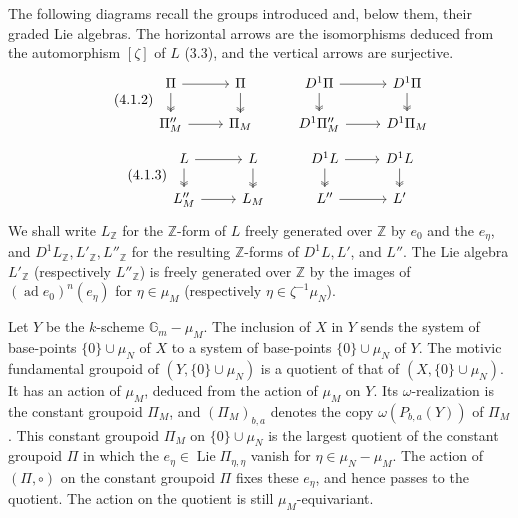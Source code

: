 \documentclass[10pt,a4paper]{article}
\newcommand{\Gm}{\mathbb G_m}
\newcommand{\Z}{\mathbb Z}
\newcommand{\Lie}{\operatorname{Lie}}
\newcommand{\ad}{\operatorname{ad}}
\theoremstyle{deligne}
\newcommand{\heading}[1]{\vspace{0.65em}\noindent{\bfseries #1}\quad}
\begin{document}
The following diagrams recall the groups introduced and, below them, their graded Lie algebras. The horizontal arrows are the isomorphisms deduced from the automorphism \([\zeta]\) of \(L\) (3.3), and the vertical arrows are surjective.
\[
\tag{4.1.2}
\begin{tikzcd}[column sep=2.5em,row sep=1.35em]
\Pi \arrow[r] \arrow[d,two heads] & \Pi \arrow[d,two heads]
& D^1\Pi \arrow[r] \arrow[d,two heads] & D^1\Pi \arrow[d,two heads]\\
\Pi_M^{\prime\prime} \arrow[r] & \Pi_M
& D^1\Pi_M^{\prime\prime} \arrow[r] & D^1\Pi_M
\end{tikzcd}
\]
\[
\tag{4.1.3}
\begin{tikzcd}[column sep=2.5em,row sep=1.35em]
L \arrow[r] \arrow[d,two heads] & L \arrow[d,two heads]
& D^1L \arrow[r] \arrow[d,two heads] & D^1L \arrow[d,two heads]\\
L_M^{\prime\prime} \arrow[r] & L_M
& L'' \arrow[r] & L'
\end{tikzcd}
\]
We shall write \(L_{\Z}\) for the \(\Z\)-form of \(L\) freely generated over \(\Z\) by \(e_0\) and the \(e_\eta\), and \(D^1L_{\Z},L'_{\Z},L''_{\Z}\) for the resulting \(\Z\)-forms of \(D^1L,L'\), and \(L''\). The Lie algebra \(L'_{\Z}\) (respectively \(L''_{\Z}\)) is freely generated over \(\Z\) by the images of \((\ad e_0)^n(e_\eta)\) for \(\eta\in\mu_M\) (respectively \(\eta\in\zeta^{-1}\mu_N\)).

\heading{4.2.} Let \(Y\) be the \(k\)-scheme \(\Gm-\mu_M\). The inclusion of \(X\) in \(Y\) sends the system of base-points \(\{0\}\cup\mu_N\) of \(X\) to a system of base-points \(\{0\}\cup\mu_N\) of \(Y\). The motivic fundamental groupoid of \((Y,\{0\}\cup\mu_N)\) is a quotient of that of \((X,\{0\}\cup\mu_N)\). It has an action of \(\mu_M\), deduced from the action of \(\mu_M\) on \(Y\). Its \(\omega\)-realization is the constant groupoid \(\Pi_M\), and \((\Pi_M)_{b,a}\) denotes the copy \(\omega(P_{b,a}(Y))\) of \(\Pi_M\). This constant groupoid \(\Pi_M\) on \(\{0\}\cup\mu_N\) is the largest quotient of the constant groupoid \(\Pi\) in which the \(e_\eta\in\Lie \Pi_{\eta,\eta}\) vanish for \(\eta\in\mu_N-\mu_M\). The action of \((\Pi,\circ)\) on the constant groupoid \(\Pi\) fixes these \(e_\eta\), and hence passes to the quotient. The action on the quotient is still \(\mu_M\)-equivariant.
\end{document}
